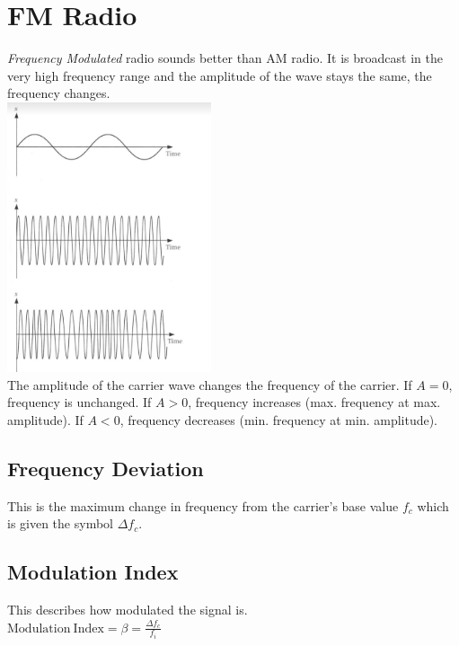 \documentclass[a4paper,11pt, twocolumn]{article}
\begin{document}
\section{FM Radio}
\textit{Frequency Modulated} radio sounds better than AM radio. It is broadcast in the very high frequency range and the amplitude of the wave stays the same, the frequency changes.\\
\includegraphics[width=0.45\textwidth]{fmSignal.jpg}\\
The amplitude of the carrier wave changes the frequency of the carrier. If $A=0$, frequency is unchanged. If $A>0$, frequency increases (max. frequency at max. amplitude). If $A<0$, frequency decreases (min. frequency at min. amplitude). 
\subsection{Frequency Deviation}
This is the maximum change in frequency from the carrier's base value $f_c$ which is given the symbol $\Delta f_c$. 
\subsection{Modulation Index}
This describes how modulated the signal is.\\
$\displaystyle \mathrm{Modulation\ Index} = \beta = \frac{\Delta f_c}{f_i}$
\end{document}
